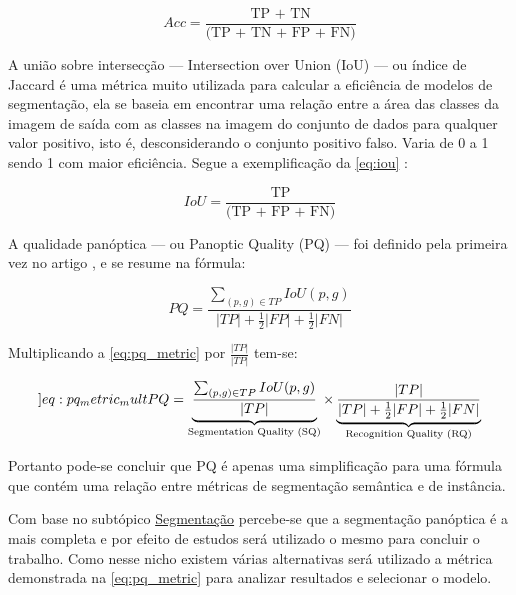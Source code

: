 \begin{equation}
	\label{eq:acc}
	Acc = \frac{\text{TP + TN}}{\text{(TP + TN + FP + FN)}}
\end{equation}


A união sobre intersecção — Intersection over Union (IoU) — ou índice de Jaccard é uma métrica muito utilizada para calcular a eficiência de modelos de segmentação, ela se baseia em encontrar uma relação entre a área das classes da imagem de saída com as classes na imagem do conjunto de dados para qualquer valor positivo, isto é, desconsiderando o conjunto positivo falso. Varia de 0 a 1 sendo 1 com maior eficiência. Segue a exemplificação da \cref{eq:iou} \space\cite{ iou_metric_link}:

\begin{equation}
	\label{eq:iou}
	IoU = \frac{\text{TP}}{\text{(TP + FP + FN)}}
\end{equation}


A qualidade panóptica — ou Panoptic Quality (PQ) — foi definido pela primeira vez no artigo \space{}, e se resume na fórmula:

\begin{equation}
\label{eq:pq_metric}
PQ = \frac{\sum_{(p,g)\in TP}IoU(p,g)}{ |TP| + \frac{1}{2}|FP| + \frac{1}{2}|FN|}
\end{equation}

Multiplicando a \cref{eq:pq_metric} por $\frac{|TP|}{|TP|}$ tem-se:

\begin{equation}
	\label[]{eq:pq_metric_mult}
	PQ = \underbrace{\frac{\sum_{(p,g)\in TP}IoU(p,g)}{|TP|}}_{\text{Segmentation Quality (SQ)}}
	\times
	\underbrace{\frac{|TP|}{|TP| + \frac{1}{2}|FP| + \frac{1}{2}|FN|}}_{\text{Recognition Quality (RQ)}}
\end{equation}

Portanto pode-se concluir que PQ é apenas uma simplificação para uma fórmula que contém uma relação entre métricas de segmentação semântica e de instância.

Com base no subtópico \hyperref[sec:segmentacao]{Segmentação} percebe-se que a segmentação panóptica é a mais completa e por efeito de estudos será utilizado o mesmo para concluir o trabalho. Como nesse nicho existem várias alternativas será utilizado a métrica demonstrada na \cref{eq:pq_metric} para analizar resultados e selecionar o modelo.

